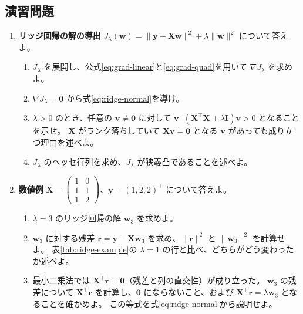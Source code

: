 \subsection{演習問題}

\begin{enumerate}

  \item \textbf{リッジ回帰の解の導出}\quad
    $J_\lambda(\bm{w}) = \|\bm{y} - \bm{X}\bm{w}\|^2 + \lambda\|\bm{w}\|^2$ について答えよ。
    \begin{enumerate}
      \item $J_\lambda$ を展開し、公式\eqref{eq:grad-linear}と\eqref{eq:grad-quad}を用いて $\nabla J_\lambda$ を求めよ。
      \item $\nabla J_\lambda = \bm{0}$ から式\eqref{eq:ridge-normal}を導け。
      \item $\lambda > 0$ のとき、任意の $\bm{v} \neq \bm{0}$ に対して $\bm{v}^\top(\bm{X}^\top\bm{X} + \lambda\bm{I})\bm{v} > 0$ となることを示せ。
        $\bm{X}$ がランク落ちしていて $\bm{X}\bm{v} = \bm{0}$ となる $\bm{v}$ があっても成り立つ理由を述べよ。
      \item $J_\lambda$ のヘッセ行列を求め、$J_\lambda$ が狭義凸であることを述べよ。
    \end{enumerate}

  \item \textbf{数値例}\quad
    $\bm{X} = \begin{pmatrix} 1 & 0 \\ 1 & 1 \\ 1 & 2 \end{pmatrix}$、$\bm{y} = (1, 2, 2)^\top$ について答えよ。
    \begin{enumerate}
      \item $\lambda = 3$ のリッジ回帰の解 $\bm{w}_3$ を求めよ。
      \item $\bm{w}_3$ に対する残差 $\bm{r} = \bm{y} - \bm{X}\bm{w}_3$ を求め、$\|\bm{r}\|^2$ と $\|\bm{w}_3\|^2$ を計算せよ。
        表\ref{tab:ridge-example}の $\lambda = 1$ の行と比べ、どちらがどう変わったか述べよ。
      \item 最小二乗法では $\bm{X}^\top\bm{r} = \bm{0}$（残差と列の直交性）が成り立った。
        $\bm{w}_3$ の残差について $\bm{X}^\top\bm{r}$ を計算し、$\bm{0}$ にならないこと、および $\bm{X}^\top\bm{r} = \lambda\bm{w}_3$ となることを確かめよ。
        この等式を式\eqref{eq:ridge-normal}から説明せよ。
    \end{enumerate}


\end{enumerate}
